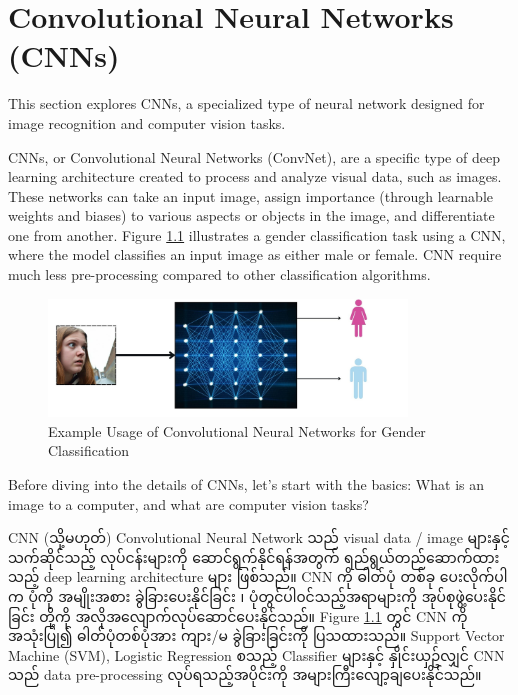 \chapter{Convolutional Neural Networks (CNNs)}\label{sec:CNN}
This section explores CNNs, a specialized type of neural network designed for image recognition and computer vision tasks.

CNNs, or Convolutional Neural Networks (ConvNet), are a specific type of deep learning architecture created to process and analyze visual data, such as images. These networks can take an input image, assign importance (through learnable weights and biases) to various aspects or objects in the image, and differentiate one from another. Figure \ref{fig:CNN_example}  illustrates a gender classification task using a CNN, where the model classifies an input image as either male or female. CNN require much less pre-processing compared to other classification algorithms. 

\vspace{1em}
\begin{figure}[h]%
\centering
\includegraphics[width=0.85\textwidth]{imgs/CNN_eg.jpg}
\caption{Example Usage of Convolutional Neural Networks for Gender Classification }\label{fig:CNN_example}
\end{figure}

\noindent Before diving into the details of CNNs, let's start with the basics: What is an image to a computer, and what are computer vision tasks?

CNN (သို့မဟုတ်) Convolutional Neural Network သည် visual data / image များနှင့် သက်ဆိုင်သည့် လုပ်ငန်းများကို ဆောင်ရွက်နိုင်ရန်အတွက် ရည်ရွယ်တည်ဆောက်ထားသည့် deep learning architecture များ ဖြစ်သည်။ CNN ကို ဓါတ်ပုံ တစ်ခု ပေးလိုက်ပါက ပုံကို အမျိုးအစား ခွဲခြားပေးနိုင်ခြင်း ၊ ပုံတွင်ပါ၀င်သည့်အရာများကို အုပ်စုဖွဲ့ပေးနိုင်ခြင်း တို့ကို အလိုအလျောက်လုပ်ဆောင်ပေးနိုင်သည်။ Figure \ref{fig:CNN_example}  တွင် CNN ကို အသုံးပြု၍ ဓါတ်ပုံတစ်ပုံအား ကျား/မ ခွဲခြားခြင်းကို ပြသထားသည်။ Support Vector Machine (SVM), Logistic Regression စသည့် Classifier များနှင့် နှိုင်းယှဥ်လျှင် CNN သည် data pre-processing လုပ်ရသည့်အပိုင်းကို အများကြီးလျော့ချပေးနိုင်သည်။ 

